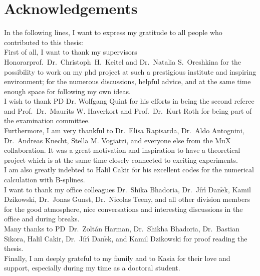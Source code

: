 \chapter*{Acknowledgements}

In the following lines, I want to express my gratitude to all people who contributed to this thesis:\\
First of all, I want to thank my supervisors Honorarprof.~Dr.~Christoph~H.~Keitel and Dr.~Natalia S.~Oreshkina for the possibility to work on my phd project at such a prestigious institute and inspiring environment; for the numerous discussions, helpful advice, and at the same time enough space for following my own ideas.\\
I wish to thank PD Dr. Wolfgang Quint for his efforts in being the second referee and Prof.~Dr.~Maurits W. Haverkort and Prof.~Dr.~Kurt Roth for being part of the examination committee.\\
Furthermore, I am very thankful to Dr.~Elisa Rapisarda, Dr.~Aldo Antognini, Dr.~Andreas Knecht, Stella M. Vogiatzi, and everyone else from the MuX collaboration. It was a great motivation and inspiration to have a theoretical project which is at the same time closely connected to exciting experiments.\\
I am also greatly indebted to Halil Cakir for his excellent codes for the numerical calculation with B-splines.\\
I want to thank my  office colleagues Dr.~Shika Bhadoria, Dr.~Ji$\check{\text{r}}${\'\i} Dan$\check{\text{e}}$k, Kamil Dzikowski, Dr.~Jonas Gunst, Dr.~Nicolas Teeny, and all other division members for the good atmosphere, nice conversations and interesting discussions in the office and during breaks.\\
Many thanks to PD~Dr.~Zoltán Harman, Dr.~Shikha Bhadoria, Dr.~Bastian Sikora, Halil Cakir, Dr.~Ji$\check{\text{r}}${\'\i} Dan$\check{\text{e}}$k, and Kamil Dzikowski for proof reading the thesis.\\%
Finally, I am deeply grateful to my family and to Kasia for their love and support, especially during my time as a doctoral student.
%




